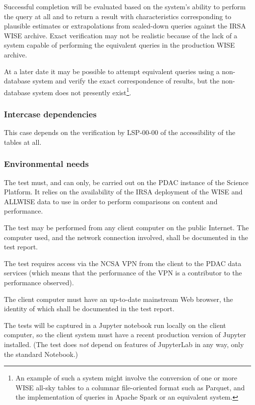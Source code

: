 Successful completion will be evaluated based on the system's ability to perform the query at all and to return a result with characteristics corresponding to plausible estimates or extrapolations from scaled-down queries against the IRSA WISE archive.
Exact verification may not be realistic because of the lack of a system capable of performing the equivalent queries in the production WISE archive.

At a later date it may be possible to attempt equivalent queries using a non-database system and verify the exact correspondence of results, but the non-database system does not presently exist\footnote{An example of such a system might involve the conversion of one or more WISE all-sky tables to a columnar file-oriented format such as Parquet, and the implementation of queries in Apache Spark or an equivalent system.}.

\subsubsection{Intercase dependencies}

This case depends on the verification by LSP-00-00 of the accessibility of the tables at all.

\subsubsection{Environmental needs}

The test must, and can only, be carried out on the PDAC instance of the Science Platform.
It relies on the availability of the IRSA deployment of the WISE and ALLWISE data to use in order to perform comparisons on content and performance.

The test may be performed from any client computer on the public Internet.
The computer used, and the network connection involved, shall be documented in the test report.

The test requires access via the NCSA VPN from the client to the PDAC data services 
(which means that the performance of the VPN is a contributor to the performance observed).

The client computer must have an up-to-date mainstream Web browser, the identity of which shall be documented in the test report.

The tests will be captured in a Jupyter notebook run locally on the client computer, so the client system must have a recent production version of Jupyter installed.
(The test does \emph{not} depend on features of JupyterLab in any way, only the standard Notebook.)


